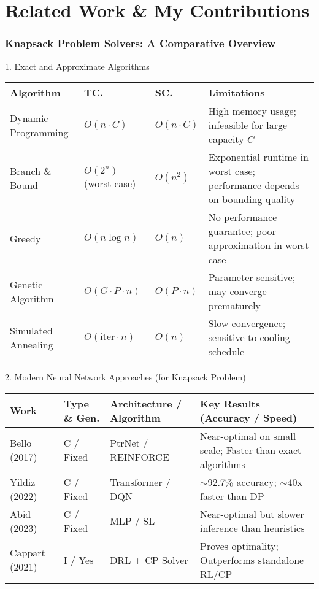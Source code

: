 \section{Related Work \& My Contributions}
\begin{frame}
    \frametitle{Knapsack Problem Solvers: A Comparative Overview}

    \begin{block}{1. Exact and Approximate Algorithms}
        \footnotesize
        \begin{tabularx}{\textwidth}{@{} l p{2.0cm} p{2.0cm} X @{}}
        \toprule
        \textbf{Algorithm} & \textbf{TC.} & \textbf{SC.} & \textbf{Limitations} \\
        \midrule
        Dynamic Programming & $O(n \cdot C)$ & $O(n \cdot C)$ & High memory usage; infeasible for large capacity $C$ \\
        Branch \& Bound & $O(2^n)$ (worst-case) & $O(n^2)$ & Exponential runtime in worst case; performance depends on bounding quality \\
        \midrule %
        Greedy & $O(n \log n)$ & $O(n)$ & No performance guarantee; poor approximation in worst case \\
        Genetic Algorithm & $O(G \cdot P \cdot n)$ & $O(P \cdot n)$ & Parameter-sensitive; may converge prematurely \\
        Simulated Annealing & $O(\text{iter} \cdot n)$ & $O(n)$ & Slow convergence; sensitive to cooling schedule \\
        \bottomrule
        \end{tabularx}
    \end{block}

    \vspace{-0.8em}

    \begin{alertblock}{2. Modern Neural Network Approaches (for Knapsack Problem)}
        \footnotesize
        \begin{tabularx}{\textwidth}{@{} l p{2.0cm} p{2.5cm} X @{}}
        \toprule
        \textbf{Work} & \textbf{Type \& Gen.} & \textbf{Architecture / Algorithm} & \textbf{Key Results (Accuracy / Speed)} \\
        \midrule
        Bello (2017) & C / Fixed & PtrNet / REINFORCE & Near-optimal on small scale; Faster than exact algorithms \\
        Yildiz (2022) & C / Fixed & Transformer / DQN & $\sim$92.7\% accuracy; $\sim$40x faster than DP \\
        Abid (2023) & C / Fixed & MLP / SL & Near-optimal but slower inference than heuristics \\
        Cappart (2021) & I / Yes & DRL + CP Solver & Proves optimality; Outperforms standalone RL/CP \\
        \bottomrule
        \end{tabularx}
    \end{alertblock}


\end{frame}
